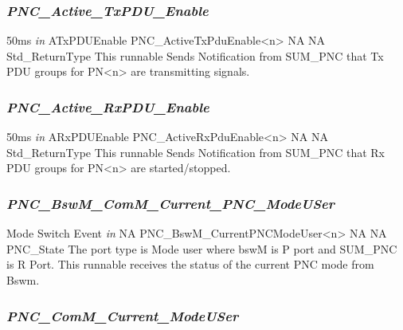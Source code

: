 { }

\subsubsection{\textit{PNC_Active_TxPDU_Enable}}

{50ms}
{ \textit{in} \hspace*{1.5in} \vrule \hspace*{0.1in} ATxPDUEnable}
{PNC_ActiveTxPduEnable<n>}
{NA}
{ NA}
{Std_ReturnType}
{This runnable Sends Notification from SUM_PNC that Tx PDU groups for PN<n> are transmitting signals.}

{}

\subsubsection{\textit{PNC_Active_RxPDU_Enable}}

{50ms}
{ \textit{in} \hspace*{1.5in} \vrule \hspace*{0.1in} ARxPDUEnable}
{PNC_ActiveRxPduEnable<n>}
{NA}
{ NA}
{Std_ReturnType}
{This runnable Sends Notification from SUM_PNC that Rx PDU groups for PN<n> are started/stopped.}

{ }

\subsubsection{\textit{PNC_BswM_ComM_Current_PNC_ModeUSer}}

{Mode Switch Event}
{\textit{in} \hspace*{1.5in} \vrule \hspace*{0.1in} NA}
{PNC_BswM_CurrentPNCModeUser<n>}
{NA}
{NA}
{PNC_State}
{The port type is Mode user where bswM is P port and SUM_PNC is R Port. This runnable receives the status of the current PNC mode from Bswm.}

{ }

\subsubsection{\textit{PNC_ComM_Current_ModeUSer}}

